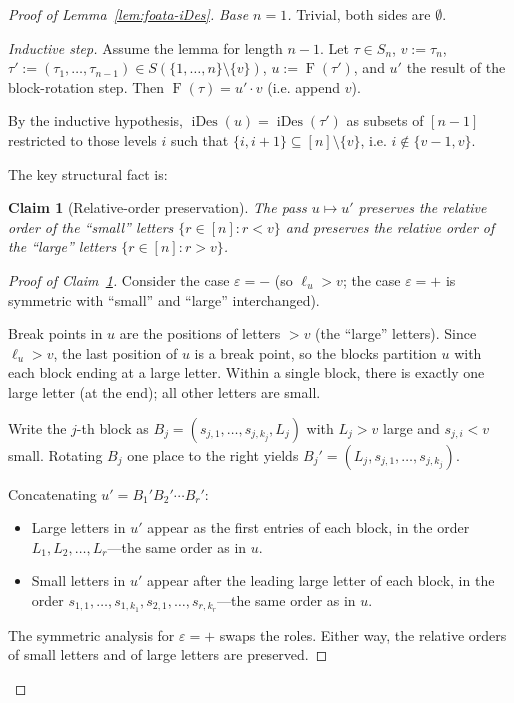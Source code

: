 \documentclass[11pt]{article}
\newtheorem*{claim}{Claim}
\theoremstyle{definition}
\DeclareMathOperator{\iDes}{iDes}
\newcommand{\Foata}{\operatorname{F}}
\begin{document}
\begin{proof}[Proof of Lemma~\ref{lem:foata-iDes}]
\emph{Base $n=1$.}  Trivial, both sides are $\emptyset$.

\emph{Inductive step.}  Assume the lemma for length $n-1$.  Let $\tau \in S_n$,
$v := \tau_n$, $\tau' := (\tau_1, \ldots, \tau_{n-1}) \in S(\{1,\ldots,n\}\setminus\{v\})$,
$u := \Foata(\tau')$, and $u'$ the result of the block-rotation step.  Then
$\Foata(\tau) = u' \cdot v$ (i.e. append $v$).

By the inductive hypothesis, $\iDes(u) = \iDes(\tau')$ as subsets of
$[n-1]$ restricted to those levels $i$ such that $\{i, i+1\} \subseteq
[n]\setminus\{v\}$, i.e. $i \notin \{v-1, v\}$.

The key structural fact is:

\begin{claim}[Relative-order preservation]
\label{claim:rop}
The pass $u \mapsto u'$ preserves the relative order of the ``small'' letters
$\{r \in [n] : r < v\}$ and preserves the relative order of the ``large''
letters $\{r \in [n] : r > v\}$.
\end{claim}

\begin{proof}[Proof of Claim~\ref{claim:rop}]
Consider the case $\varepsilon = -$ (so $\ell_u > v$; the case
$\varepsilon = +$ is symmetric with ``small'' and ``large'' interchanged).

Break points in $u$ are the positions of letters $> v$ (the ``large''
letters).  Since $\ell_u > v$, the last position of $u$ is a break point,
so the blocks partition $u$ with each block ending at a large letter.  Within
a single block, there is exactly one large letter (at the end); all other
letters are small.

Write the $j$-th block as $B_j = (s_{j,1}, \ldots, s_{j,k_j}, L_j)$ with
$L_j > v$ large and $s_{j,i} < v$ small.  Rotating $B_j$ one place to the
right yields $B_j' = (L_j, s_{j,1}, \ldots, s_{j,k_j})$.

Concatenating $u' = B_1' B_2' \cdots B_r'$:
\begin{itemize}
\item Large letters in $u'$ appear as the first entries of each block, in
    the order $L_1, L_2, \ldots, L_r$---the same order as in $u$.
\item Small letters in $u'$ appear after the leading large letter of each
    block, in the order $s_{1,1}, \ldots, s_{1,k_1}, s_{2,1}, \ldots,
    s_{r,k_r}$---the same order as in $u$.
\end{itemize}
The symmetric analysis for $\varepsilon = +$ swaps the roles.  Either way,
the relative orders of small letters and of large letters are preserved.
\end{proof}


\end{proof}
\end{document}
